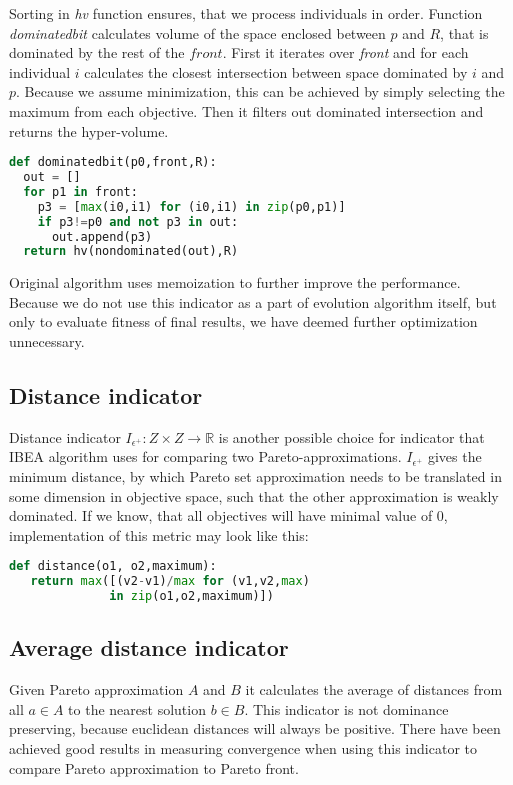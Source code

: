 \documentclass[12pt,oneside]{fithesis2}
\begin{document}
Sorting in \emph{hv} function ensures, that we process individuals in order. Function \emph{dominatedbit} calculates volume of the space enclosed between $p$ and $R$, that is dominated by the rest of the $front$. First it iterates over \emph{front} and for each individual $i$ calculates the closest intersection between space dominated by $i$ and $p$. Because we assume minimization, this can be achieved by simply selecting the maximum from each objective. Then it filters out dominated intersection and returns the hyper-volume.

\begin{lstlisting}[language=Python,label=eps_example,caption=Calculation of intersecting hypervolumes]
def dominatedbit(p0,front,R):
  out = []
  for p1 in front:
    p3 = [max(i0,i1) for (i0,i1) in zip(p0,p1)]
    if p3!=p0 and not p3 in out:
      out.append(p3)
  return hv(nondominated(out),R)
\end{lstlisting}

Original algorithm\cite{russo2012quick} uses memoization to further improve the performance. Because we do not use this indicator as a part of evolution algorithm itself, but only to evaluate fitness of final results, we have deemed further optimization unnecessary. 

\subsection{Distance indicator}
Distance indicator $I_{\epsilon^{+}}: Z \times Z \to  \mathbb{R}$ is another possible choice for indicator that IBEA algorithm uses for comparing two Pareto-approximations. $I_{\epsilon^{+}}$ gives the minimum distance, by which Pareto set approximation needs to be translated in some dimension in objective space, such that the other approximation is weakly dominated. If we know, that all objectives will have minimal value of 0, implementation of this metric may look like this:

\begin{lstlisting}[language=Python,label=eps_example,caption=Distance indicator implementation]
def distance(o1, o2,maximum):
   return max([(v2-v1)/max for (v1,v2,max) 
              in zip(o1,o2,maximum)])
\end{lstlisting}

\subsection{Average distance indicator}
Given Pareto approximation $A$ and $B$ it calculates the average of distances from all $a \in A$ to the nearest solution $b \in B$. This indicator is not dominance preserving, because euclidean distances will always be positive. There have been achieved good results in measuring convergence when using this indicator to compare Pareto approximation to Pareto front\cite{stehl2013opt}.
\end{document}
